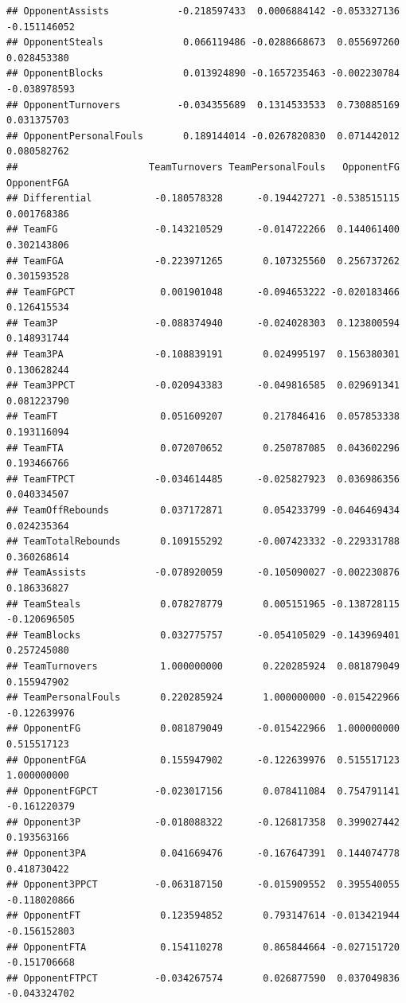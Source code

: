 \documentclass[
]{book}
\begin{document}
\begin{verbatim}
## OpponentAssists            -0.218597433  0.0006884142 -0.053327136 -0.151146052
## OpponentSteals              0.066119486 -0.0288668673  0.055697260  0.028453380
## OpponentBlocks              0.013924890 -0.1657235463 -0.002230784 -0.038978593
## OpponentTurnovers          -0.034355689  0.1314533533  0.730885169  0.031375703
## OpponentPersonalFouls       0.189144014 -0.0267820830  0.071442012  0.080582762
##                       TeamTurnovers TeamPersonalFouls   OpponentFG  OpponentFGA
## Differential           -0.180578328      -0.194427271 -0.538515115  0.001768386
## TeamFG                 -0.143210529      -0.014722266  0.144061400  0.302143806
## TeamFGA                -0.223971265       0.107325560  0.256737262  0.301593528
## TeamFGPCT               0.001901048      -0.094653222 -0.020183466  0.126415534
## Team3P                 -0.088374940      -0.024028303  0.123800594  0.148931744
## Team3PA                -0.108839191       0.024995197  0.156380301  0.130628244
## Team3PPCT              -0.020943383      -0.049816585  0.029691341  0.081223790
## TeamFT                  0.051609207       0.217846416  0.057853338  0.193116094
## TeamFTA                 0.072070652       0.250787085  0.043602296  0.193466766
## TeamFTPCT              -0.034614485      -0.025827923  0.036986356  0.040334507
## TeamOffRebounds         0.037172871       0.054233799 -0.046469434  0.024235364
## TeamTotalRebounds       0.109155292      -0.007423332 -0.229331788  0.360268614
## TeamAssists            -0.078920059      -0.105090027 -0.002230876  0.186336827
## TeamSteals              0.078278779       0.005151965 -0.138728115 -0.120696505
## TeamBlocks              0.032775757      -0.054105029 -0.143969401  0.257245080
## TeamTurnovers           1.000000000       0.220285924  0.081879049  0.155947902
## TeamPersonalFouls       0.220285924       1.000000000 -0.015422966 -0.122639976
## OpponentFG              0.081879049      -0.015422966  1.000000000  0.515517123
## OpponentFGA             0.155947902      -0.122639976  0.515517123  1.000000000
## OpponentFGPCT          -0.023017156       0.078411084  0.754791141 -0.161220379
## Opponent3P             -0.018088322      -0.126817358  0.399027442  0.193563166
## Opponent3PA             0.041669476      -0.167647391  0.144074778  0.418730422
## Opponent3PPCT          -0.063187150      -0.015909552  0.395540055 -0.118020866
## OpponentFT              0.123594852       0.793147614 -0.013421944 -0.156152803
## OpponentFTA             0.154110278       0.865844664 -0.027151720 -0.151706668
## OpponentFTPCT          -0.034267574       0.026877590  0.037049836 -0.043324702

\end{verbatim}
\end{document}
